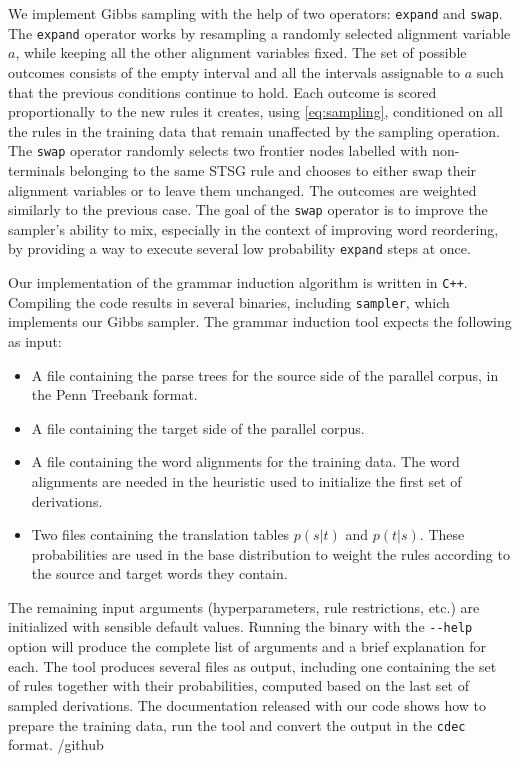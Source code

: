 \documentclass[nofonts]{pbml} %
\begin{document}
We implement Gibbs sampling with the help of two operators: \texttt{expand} and \texttt{swap}. The \texttt{expand} operator works by resampling a randomly selected alignment variable $a$, while keeping all the other alignment variables fixed. The set of possible outcomes consists of the empty interval and all the intervals assignable to $a$ such that the previous conditions continue to hold. Each outcome is scored proportionally to the new rules it creates,  using \autoref{eq:sampling}, conditioned on all the rules in the training data that remain unaffected by the sampling operation. The \texttt{swap} operator randomly selects two frontier nodes labelled with non-terminals belonging to the same STSG rule and chooses to either swap their alignment variables or to leave them unchanged. The outcomes are weighted similarly to the previous case. The goal of the \texttt{swap} operator is to improve the sampler's ability to mix, especially in the context of improving word reordering, by providing a way to execute several low probability \texttt{expand} steps at once.

Our implementation of the grammar induction algorithm is written in \texttt{C++}. Compiling the code results in several binaries, including \texttt{sampler}, which implements our Gibbs sampler. The grammar induction tool expects the following as input:
\begin{itemize}
\item A file containing the parse trees for the source side of the parallel corpus, in the Penn Treebank format.
\item A file containing the target side of the parallel corpus.
\item A file containing the word alignments for the training data. The word alignments are needed in the heuristic \citep{Galley2004} used to initialize the first set of derivations.
\item Two files containing the translation tables $p(s | t)$ and $p(t | s)$. These probabilities are used in the base distribution to weight the rules according to the source and target words they contain.
\end{itemize}
The remaining input arguments (hyperparameters, rule restrictions, etc.) are initialized with sensible default values. Running the binary with the \texttt{-{}-help} option will produce the complete list of arguments and a brief explanation for each. The tool produces several files as output, including one containing the set of rules together with their probabilities, computed based on the last set of sampled derivations. The documentation released with our code shows how to prepare the training data, run the tool and convert the output in the \texttt{cdec} format.
/github
\end{document}
